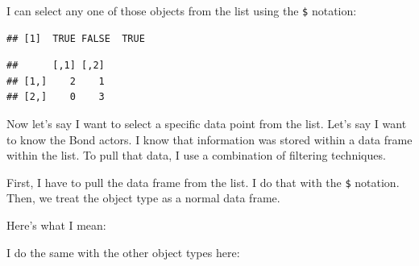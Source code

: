 \documentclass[
]{book}
\newenvironment{Shaded}{\begin{snugshade}}{\end{snugshade}}
\newcommand{\DecValTok}[1]{\textcolor[rgb]{0.00,0.00,0.81}{#1}}
\newcommand{\NormalTok}[1]{#1}
\newcommand{\OperatorTok}[1]{\textcolor[rgb]{0.81,0.36,0.00}{\textbf{#1}}}
\newcommand{\StringTok}[1]{\textcolor[rgb]{0.31,0.60,0.02}{#1}}
\begin{document}
\begin{center}
I can select any one of those objects from the list using the \texttt{\$} notation:

\begin{Shaded}
\end{Shaded}

\begin{verbatim}
## [1]  TRUE FALSE  TRUE
\end{verbatim}

\begin{Shaded}
\end{Shaded}

\begin{verbatim}
##      [,1] [,2]
## [1,]    2    1
## [2,]    0    3
\end{verbatim}

Now let's say I want to select a specific data point from the list. Let's say I want to know the Bond actors. I know that information was stored within a data frame within the list. To pull that data, I use a combination of filtering techniques.

First, I have to pull the data frame from the list. I do that with the \texttt{\$} notation. Then, we treat the object type as a normal data frame.

Here's what I mean:

\begin{Shaded}
\end{Shaded}

I do the same with the other object types here:

\begin{Shaded}
\end{Shaded}


\end{center}
\end{document}
